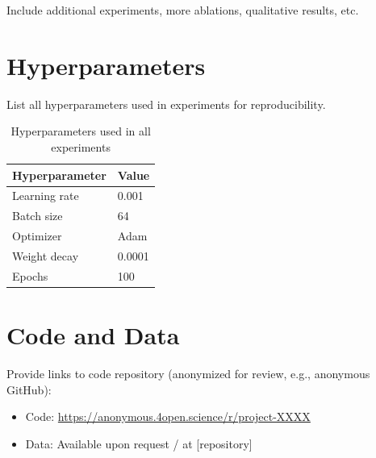 \documentclass{article}
\begin{document}
Include additional experiments, more ablations, qualitative results, etc.

\section{Hyperparameters}
\label{app:hyperparameters}

List all hyperparameters used in experiments for reproducibility.

\begin{table}[h]
\centering
\caption{Hyperparameters used in all experiments}
\begin{tabular}{ll}
\toprule
Hyperparameter & Value \\
\midrule
Learning rate & 0.001 \\
Batch size & 64 \\
Optimizer & Adam \\
Weight decay & 0.0001 \\
Epochs & 100 \\
\bottomrule
\end{tabular}
\end{table}

\section{Code and Data}
\label{app:code}

Provide links to code repository (anonymized for review, e.g., anonymous GitHub):
\begin{itemize}
    \item Code: \url{https://anonymous.4open.science/r/project-XXXX}
    \item Data: Available upon request / at [repository]
\end{itemize}
\end{document}
